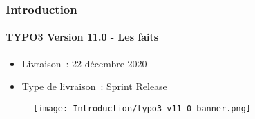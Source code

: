 %

\begin{frame}[fragile]
	\frametitle{Introduction}
	\framesubtitle{TYPO3 Version 11.0 - Les faits}

	\begin{itemize}
		\item Livraison~: 22 décembre 2020
		\item Type de livraison~: Sprint Release
	\end{itemize}

	\begin{figure}
		\texttt{[image: Introduction/typo3-v11-0-banner.png]}
	\end{figure}

\end{frame}


